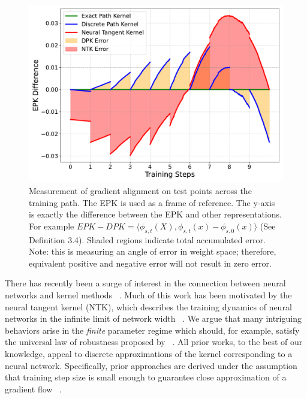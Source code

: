 \begin{figure}[!ht]
        \centering
        \includegraphics[width=1.01\linewidth]{c4_figures/estimation_comparison.pdf}

        \caption{Measurement of gradient alignment on test points across the training path. The EPK is used as a frame of reference. The y-axis is exactly the difference between the EPK and other representations. For example $EPK-DPK = \langle \phi_{s,t}(X), \phi_{s,t}(x) - \phi_{s,0}(x) \rangle$ (See Definition 3.4). Shaded regions indicate total accumulated error. Note: this is measuring an angle of error in weight space; therefore, equivalent positive and negative error will not result in zero error.}
        \label{fig:error}
\end{figure}

There has recently been a surge of interest in the connection between neural networks and kernel methods ~\citep{bietti2019bias, du2019graphntk, tancik2020fourierfeatures, abdar2021uq, geifman2020similarity, chen2020generalized, alemohammad2021recurrent}. Much of this work has been motivated by the neural tangent kernel (NTK), which describes the training dynamics of neural networks in the infinite limit of network width ~\citep{jacot2018neural}.
We argue that many intriguing behaviors arise in the \emph{finite} parameter regime which should, for example, satisfy the universal law of robustness proposed by ~\citet{DBLP:conf/nips/BubeckS21}. 
All prior works, to the best of our knowledge, appeal to discrete approximations of the kernel corresponding to a neural network. 
Specifically, prior approaches are derived under the assumption that training step size is small enough to guarantee close approximation of a gradient flow
~\citep{ghojogh2021, shawe2004kernel, zhao2005extracting}.

